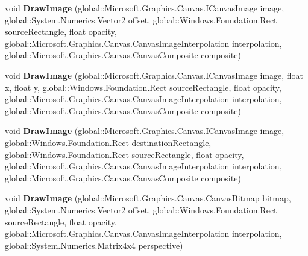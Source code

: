 \begin{DoxyCompactItemize}
void {\bfseries Draw\+Image} (global\+::\+Microsoft.\+Graphics.\+Canvas.\+I\+Canvas\+Image image, global\+::\+System.\+Numerics.\+Vector2 offset, global\+::\+Windows.\+Foundation.\+Rect source\+Rectangle, float opacity, global\+::\+Microsoft.\+Graphics.\+Canvas.\+Canvas\+Image\+Interpolation interpolation, global\+::\+Microsoft.\+Graphics.\+Canvas.\+Canvas\+Composite composite)
\item 
\mbox{\label{interface_microsoft_1_1_graphics_1_1_canvas_1_1_i_canvas_drawing_session_a68dcdebbbb8491e7b5423f40b2a6349e}} 
void {\bfseries Draw\+Image} (global\+::\+Microsoft.\+Graphics.\+Canvas.\+I\+Canvas\+Image image, float x, float y, global\+::\+Windows.\+Foundation.\+Rect source\+Rectangle, float opacity, global\+::\+Microsoft.\+Graphics.\+Canvas.\+Canvas\+Image\+Interpolation interpolation, global\+::\+Microsoft.\+Graphics.\+Canvas.\+Canvas\+Composite composite)
\item 
\mbox{\label{interface_microsoft_1_1_graphics_1_1_canvas_1_1_i_canvas_drawing_session_a993f83bad2b787c45b41d577a3f93f10}} 
void {\bfseries Draw\+Image} (global\+::\+Microsoft.\+Graphics.\+Canvas.\+I\+Canvas\+Image image, global\+::\+Windows.\+Foundation.\+Rect destination\+Rectangle, global\+::\+Windows.\+Foundation.\+Rect source\+Rectangle, float opacity, global\+::\+Microsoft.\+Graphics.\+Canvas.\+Canvas\+Image\+Interpolation interpolation, global\+::\+Microsoft.\+Graphics.\+Canvas.\+Canvas\+Composite composite)
\item 
\mbox{\label{interface_microsoft_1_1_graphics_1_1_canvas_1_1_i_canvas_drawing_session_acf7e6993427ce05997a8eb83b4be05dc}} 
void {\bfseries Draw\+Image} (global\+::\+Microsoft.\+Graphics.\+Canvas.\+Canvas\+Bitmap bitmap, global\+::\+System.\+Numerics.\+Vector2 offset, global\+::\+Windows.\+Foundation.\+Rect source\+Rectangle, float opacity, global\+::\+Microsoft.\+Graphics.\+Canvas.\+Canvas\+Image\+Interpolation interpolation, global\+::\+System.\+Numerics.\+Matrix4x4 perspective)
\item 
\mbox{\label{interface_microsoft_1_1_graphics_1_1_canvas_1_1_i_canvas_drawing_session_a54c1165443e61a4fb85bec846c49b766}} 

\end{DoxyCompactItemize}
